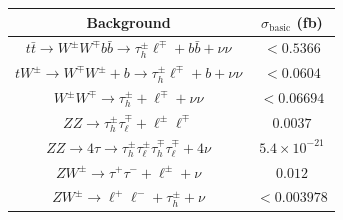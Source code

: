 \documentclass[prd,amsfonts,onecolumn,superscriptaddress,aps,nofootinbib,11pt]{revtex4-1}
\begin{document}
\begin{table} %

\begin{tabular}{c c}
\hline
Background & $\sigma_{\text{basic}}$ (fb) \\ 
\hline\hline%

$t\bar{t}\to W^\pm W^\mp b\bar{b}\to \tau^{\pm}_h \ell^{\mp} + b\bar{b}+\nu\nu$ & $<0.5366$ \\ 
\hline %

$tW^\pm \to W^\mp W^\pm+b\to \tau^{\pm}_h \ell^{\mp} + b+ \nu\nu$ & $<0.0604$ \\ 
\hline %

$W^\pm W^\mp\to \tau_h^\pm + \ell^\mp + \nu\nu$ & $<0.06694$   \\  %

$ZZ\to \tau_h^\pm\tau_{\ell}^\mp + \ell^\pm\ell^\mp$ & $0.0037$    \\ %

$ZZ \to 4\tau \to \tau_h^\pm \tau_\ell^\pm \tau_h^\mp \tau_\ell^\mp + 4 \nu$  & $5.4 \times 10^{-21}$\\
$ZW^\pm \to \tau^+ \tau^- + \ell^\pm + \nu$ & $0.012$ \\  
$ZW^\pm\to \ell^+\ell^- + \tau_h^\pm + \nu$  & $<0.003978$ \\ 
\hline  %



\end{tabular}
\end{table}
\end{document}
